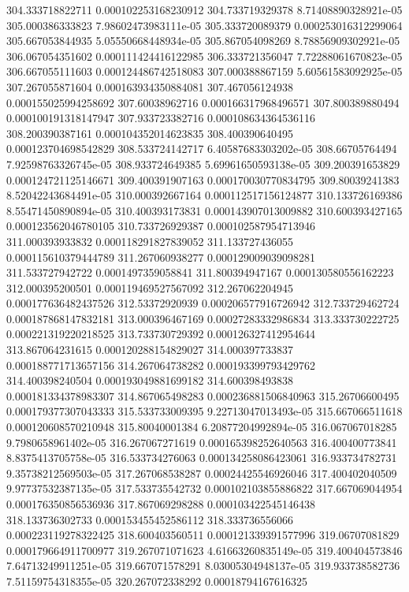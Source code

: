 {304.333718822711 0.000102253168230912
304.733719329378 8.71408890328921e-05
305.000386333823 7.98602473983111e-05
305.333720089379 0.000253016312299064
305.667053844935 5.05550668448934e-05
305.867054098269 8.78856909302921e-05
306.067054351602 0.000111424416122985
306.333721356047 7.72288061670823e-05
306.667055111603 0.000124486742518083
307.000388867159 5.60561583092925e-05
307.267055871604 0.000163934350884081
307.467056124938 0.000155025994258692
307.60038962716 0.000166317968496571
307.800389880494 0.000100191318147947
307.933723382716 0.000108634364536116
308.200390387161 0.000104352014623835
308.400390640495 0.000123704698542829
308.533724142717 6.40587683303202e-05
308.66705764494 7.92598763326745e-05
308.933724649385 5.69961650593138e-05
309.200391653829 0.000124721125146671
309.400391907163 0.000170030770834795
309.80039241383 8.52042243684491e-05
310.000392667164 0.000112517156124877
310.133726169386 8.55471450890894e-05
310.400393173831 0.000143907013009882
310.600393427165 0.000123562046780105
310.733726929387 0.000102587954713946
311.000393933832 0.000118291827839052
311.133727436055 0.000115610379444789
311.267060938277 0.000129009039098281
311.533727942722 0.0001497359058841
311.800394947167 0.000130580556162223
312.000395200501 0.000119469527567092
312.267062204945 0.000177636482437526
312.53372920939 0.000206577916726942
312.733729462724 0.000187868147832181
313.000396467169 0.00027283332986834
313.333730222725 0.000221319220218525
313.733730729392 0.000126327412954644
313.867064231615 0.000120288154829027
314.000397733837 0.000188771713657156
314.267064738282 0.000193399793429762
314.400398240504 0.000193049881699182
314.600398493838 0.000181334378983307
314.867065498283 0.000236881506840963
315.26706600495 0.000179377307043333
315.533733009395 9.22713047013493e-05
315.667066511618 0.000120608570210948
315.80040001384 6.20877204992894e-05
316.067067018285 9.7980658961402e-05
316.267067271619 0.000165398252640563
316.400400773841 8.8375413705758e-05
316.533734276063 0.000134258086423061
316.933734782731 9.35738212569503e-05
317.267068538287 0.00024425546926046
317.400402040509 9.97737532387135e-05
317.533735542732 0.000102103855886822
317.667069044954 0.000176350856536936
317.867069298288 0.000103422545146438
318.133736302733 0.000153455452586112
318.333736556066 0.000223119278322425
318.600403560511 0.000121339391577996
319.06707081829 0.000179664911700977
319.267071071623 4.61663260835149e-05
319.400404573846 7.64713249911251e-05
319.667071578291 8.03005304948137e-05
319.933738582736 7.51159754318355e-05
320.267072338292 0.00018794167616325
}
